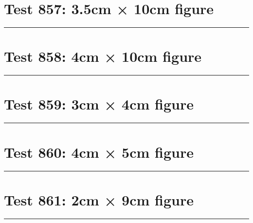\documentclass[a4paper,11pt]{article}
\begin{document}
\section*{Test 857: 3.5cm × 10cm figure}
\begin{swarmwrap}%
  \begin{minipage}[t]{3cm}
    \centering
    \rule{\linewidth}{10cm}
  \end{minipage}%
\end{swarmwrap}%
\swarmwrapnext
\lipsum[90]
\lipsum[91]
\lipsum[92]
\lipsum[93]
\lipsum[94]
\lipsum[95]
\section*{Test 858: 4cm × 10cm figure}
\begin{swarmwrap}%
  \begin{minipage}[t]{4cm}
    \centering
    \rule{\linewidth}{10cm}
  \end{minipage}%
\end{swarmwrap}%
\swarmwrapnext
\lipsum[101]
\lipsum[102]
\lipsum[103]
\lipsum[104]
\lipsum[105]
\section*{Test 859: 3cm × 4cm figure}
\begin{swarmwrap}%
  \begin{minipage}[t]{3cm}
    \centering
    \rule{\linewidth}{4cm}
  \end{minipage}%
\end{swarmwrap}%
\swarmwrapnext
\lipsum[83]
\lipsum[84]
\lipsum[85]
\section*{Test 860: 4cm × 5cm figure}
\begin{swarmwrap}%
  \begin{minipage}[t]{4cm}
    \centering
    \rule{\linewidth}{5cm}
  \end{minipage}%
\end{swarmwrap}%
\swarmwrapnext
\lipsum[73]
\lipsum[74]
\lipsum[75]
\section*{Test 861: 2cm × 9cm figure}
\begin{swarmwrap}%
  \begin{minipage}[t]{2cm}
    \centering
    \rule{\linewidth}{9cm}
  \end{minipage}%
\end{swarmwrap}%
\swarmwrapnext
\lipsum[1]
\lipsum[2]
\lipsum[3]
\lipsum[4]
\lipsum[5]
\end{document}
